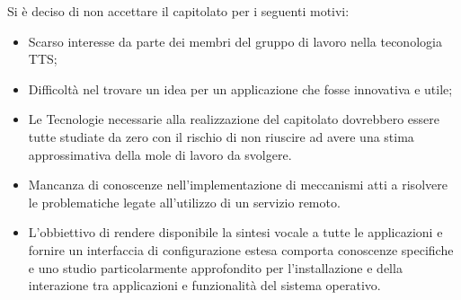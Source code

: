 \documentclass[12pt,a4paper]{article}
\begin{document}
Si è deciso di non accettare il capitolato per i seguenti motivi:
\begin{itemize}
\item Scarso interesse da parte dei membri del gruppo di lavoro nella teconologia TTS;
\item Difficoltà nel trovare un idea per un applicazione che fosse innovativa e utile;
\item Le Tecnologie necessarie alla realizzazione del capitolato dovrebbero essere tutte studiate da zero con il rischio di non riuscire ad avere una stima approssimativa della mole di lavoro da svolgere.
\item Mancanza di conoscenze nell'implementazione di meccanismi atti a risolvere le problematiche legate all'utilizzo di un servizio remoto.
\item L'obbiettivo di rendere disponibile la sintesi vocale a tutte le applicazioni e fornire un interfaccia di configurazione estesa comporta conoscenze specifiche e uno studio particolarmente approfondito per l'installazione e della interazione tra applicazioni e funzionalità del sistema operativo.
\end{itemize}
\end{document}
